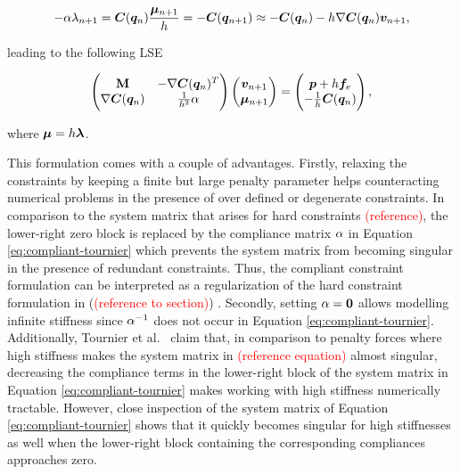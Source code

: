 \[
    -\mathbf{\alpha\lambda}_{n+1} = \bm{C}(\bm{q}_n)\frac{\bm{\mu}_{n+1}}{h} = -\bm{C}(\bm{q}_{n+1}) \approx -\bm{C}(\bm{q}_n) - h\nabla 
    \bm{C}(\bm{q}_n) \bm{v}_{n+1},
\]

\noindent leading to the following LSE \cite{tournier2015}

\begin{equation}\label{eq:compliant-tournier}
\begin{pmatrix}
    \mathbf{M} & -\nabla \bm{C}(\bm{q}_n)^T \\
    \nabla \bm{C}(\bm{q}_n) & \frac{1}{h^2}\mathbf{\alpha}
\end{pmatrix}
\begin{pmatrix}
    \bm{v}_{n+1} \\
    \bm{\mu}_{n+1}
\end{pmatrix}
=
\begin{pmatrix}
    \bm{p} + h\bm{f}_e \\
    - \frac{1}{h}\bm{C}(\bm{q}_n)
\end{pmatrix},
\end{equation}

\noindent where $\bm{\mu} = h\bm{\lambda}$.

This formulation comes with a couple of advantages. Firstly, relaxing the constraints by keeping a finite but large penalty parameter helps
counteracting numerical problems in the presence of over defined or degenerate constraints. In comparison to the system matrix that arises
for hard constraints \textcolor{red}{(reference)}, the lower-right zero block is replaced by the compliance matrix $\mathbf{\alpha}$ in 
Equation \ref{eq:compliant-tournier} which prevents the system matrix from becoming singular in the presence of redundant constraints. Thus, the 
compliant 
constraint formulation can be interpreted as a regularization of the hard constraint formulation in (\textcolor{red}{(reference to section)}) 
\cite{tournier2015}. Secondly, setting $\mathbf{\alpha} = \mathbf{0}$ allows modelling infinite stiffness since $\mathbf{\alpha}^{-1}$ does not occur in
Equation \ref{eq:compliant-tournier}. Additionally, Tournier et 
al.\ \cite{tournier2015} claim that, in comparison to penalty forces where high stiffness makes the system matrix in 
\textcolor{red}{(reference equation)} almost singular, decreasing the compliance terms in the lower-right block of the system matrix 
in Equation \ref{eq:compliant-tournier} makes working with high stiffness numerically tractable. However, close inspection of the system matrix of 
Equation \ref{eq:compliant-tournier} shows that it quickly becomes singular for high stiffnesses as well when the lower-right block containing the 
corresponding compliances approaches zero. 

